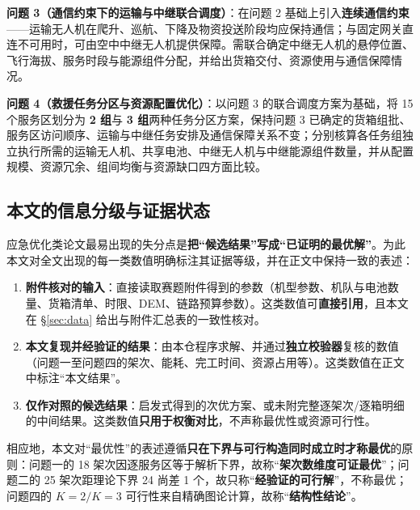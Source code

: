 \noindent \textbf{问题 3（通信约束下的运输与中继联合调度）}：在问题 2 基础上引入\textbf{连续通信约束}——运输无人机在爬升、巡航、下降及物资投送阶段均应保持通信；与固定网关直连不可用时，可由空中中继无人机提供保障。需联合确定中继无人机的悬停位置、飞行海拔、服务时段与能源组件分配，并给出货箱交付、资源使用与通信保障情况。

\noindent \textbf{问题 4（救援任务分区与资源配置优化）}：以问题 3 的联合调度方案为基础，将 15 个服务区划分为 \textbf{2 组}与 \textbf{3 组}两种任务分区方案，保持问题 3 已确定的货箱组批、服务区访问顺序、运输与中继任务安排及通信保障关系不变；分别核算各任务组独立执行所需的运输无人机、共享电池、中继无人机与中继能源组件数量，并从配置规模、资源冗余、组间均衡与资源缺口四方面比较。

\subsection{本文的信息分级与证据状态}

应急优化类论文最易出现的失分点是\textbf{把“候选结果”写成“已证明的最优解”}。为此本文对全文出现的每一类数值明确标注其证据等级，并在正文中保持一致的表述：

\begin{enumerate}[label=\textbf{等级 \arabic*}]
	\item \textbf{附件核对的输入}：直接读取赛题附件得到的参数（机型参数、机队与电池数量、货箱清单、时限、DEM、链路预算参数）。这类数值可\textbf{直接引用}，且本文在 \S\ref{sec:data} 给出与附件汇总表的一致性核对。
	\item \textbf{本文复现并经验证的结果}：由本仓程序求解、并通过\textbf{独立校验器}复核的数值（问题一至问题四的架次、能耗、完工时间、资源占用等）。这类数值在正文中标注“本文结果”。
	\item \textbf{仅作对照的候选结果}：启发式得到的次优方案、或未附完整逐架次/逐箱明细的中间结果。这类数值\textbf{只用于权衡对比}，不声称最优性或资源可行性。
\end{enumerate}

相应地，本文对“最优性”的表述遵循\textbf{只在下界与可行构造同时成立时才称最优}的原则：问题一的 18 架次因逐服务区等于解析下界，故称“\textbf{架次数维度可证最优}”；问题二的 25 架次距理论下界 24 尚差 1 个，故只称“\textbf{经验证的可行解}”，不称最优；问题四的 $K=2/K=3$ 可行性来自精确图论计算，故称“\textbf{结构性结论}”。
